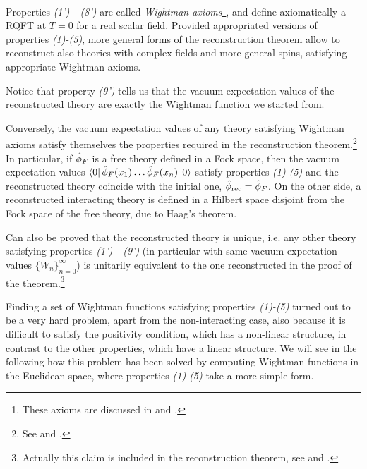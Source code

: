 \documentclass[../main/main.tex]{subfiles}
\begin{document}
Properties \textit{(1') - (8')} are called \emph{Wightman axioms}\footnote{These axioms are discussed in \cite[Section 3.1]{Streater:2000} and \cite[Section 3.2]{Jost.:1965}.}, and define axiomatically a RQFT at $T=0$ for a real scalar field. Provided appropriated versions of properties \textit{(1)-(5)}, more general forms of the reconstruction theorem allow to reconstruct also theories with complex fields and more general spins, satisfying appropriate Wightman axioms. 

Notice that property \textit{(9')} tells us that the vacuum expectation values of the reconstructed theory are exactly the Wightman function we started from. 

Conversely, the vacuum expectation values of any theory satisfying Wightman axioms satisfy themselves the properties required in the reconstruction theorem.\footnote{See \cite[Theorems 3.1-3.4]{Streater:2000} and \cite[Section 3.3]{Jost.:1965}.}  In particular, if $\hat{\phi}_F$ is a free theory defined in a Fock space, then the vacuum expectation values $\langle0\vert\,\hat{\phi}_F(x_1)\ldots\hat{\phi}_F(x_n)\,\vert0\rangle$ satisfy properties \textit{(1)-(5)} and the reconstructed theory coincide with the initial one, $\hat{\phi}_{\text{rec}}=\hat{\phi}_F$. On the other side, a reconstructed interacting theory is defined in a Hilbert space disjoint from the Fock space of the free theory, due to Haag's theorem. 

Can also be proved that the reconstructed theory is unique, i.e. any other theory satisfying properties \textit{(1') - (9')} (in particular with same vacuum expectation values $\{W_n\}_{n=0}^\infty$) is unitarily equivalent to the one reconstructed in the proof of the theorem.\footnote{Actually this claim is included in the reconstruction theorem, see \cite[Thm. 3.7]{Streater:2000} and \cite[Section 3.4, Thm. 1]{Jost.:1965}.} 

Finding a set of Wightman functions satisfying properties \textit{(1)-(5)} turned out to be a very hard problem, apart from the non-interacting case, also because it is difficult to satisfy the positivity condition, which has a non-linear structure, in contrast to the other properties, which have a linear structure. We will see in the following how this problem has been solved by computing Wightman functions in the Euclidean space, where properties \textit{(1)-(5)} take a more simple form.
\end{document}
